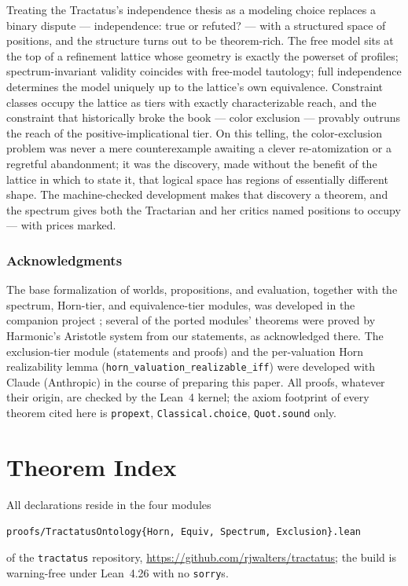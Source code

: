 \documentclass[10pt, letterpaper]{article}
\theoremstyle{remark}
\newcommand{\lean}[1]{\texttt{#1}}
\begin{document}
Treating the Tractatus's independence thesis as a modeling choice replaces a
binary dispute --- independence: true or refuted? --- with a structured
space of positions, and the structure turns out to be theorem-rich. The free
model sits at the top of a refinement lattice whose geometry is exactly the
powerset of profiles; spectrum-invariant validity coincides with free-model
tautology; full independence determines the model uniquely up to the
lattice's own equivalence. Constraint classes occupy the lattice as tiers
with exactly characterizable reach, and the constraint that historically
broke the book --- color exclusion --- provably outruns the reach of the
positive-implicational tier. On this telling, the color-exclusion problem
was never a mere counterexample awaiting a clever re-atomization or a
regretful abandonment; it was the discovery, made without the benefit of the
lattice in which to state it, that logical space has regions of essentially
different shape. The machine-checked development makes that discovery a
theorem, and the spectrum gives both the Tractarian and her critics named
positions to occupy --- with prices marked.

\subsubsection*{Acknowledgments}

The base formalization of worlds, propositions, and evaluation, together with
the spectrum, Horn-tier, and equivalence-tier modules, was developed in the
companion project \cite{companion2026}; several of the ported modules'
theorems were proved by Harmonic's Aristotle system from our statements, as
acknowledged there. The exclusion-tier module (statements and proofs) and
the per-valuation Horn realizability lemma
(\lean{horn\_valuation\_realizable\_iff}) were
developed with Claude (Anthropic) in the course of preparing this paper. All
proofs, whatever their origin, are checked by the Lean~4 kernel; the axiom
footprint of every theorem cited here is \lean{propext},
\lean{Classical.choice}, \lean{Quot.sound} only.

\appendix

\section{Theorem Index}\label{app:index}

All declarations reside in the four modules
\begin{center}
\lean{proofs/TractatusOntology\{Horn,\,Equiv,\,Spectrum,\,Exclusion\}.lean}
\end{center}
of the \lean{tractatus} repository,
\url{https://github.com/rjwalters/tractatus}; the build is warning-free
under Lean~4.26 with no \lean{sorry}s.
\end{document}
